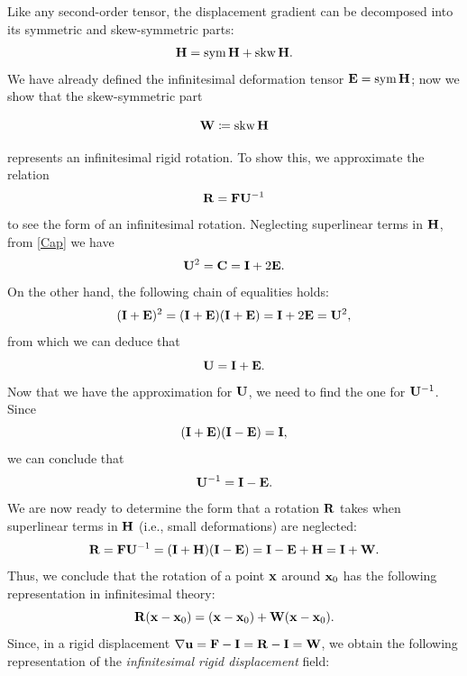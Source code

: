 Like any second-order tensor, the displacement gradient can be decomposed into its symmetric and skew-symmetric parts:
\begin{equation}
	\mathbf{H}=\operatorname{sym} \mathbf{H}+\operatorname{skw} \mathbf{H}.
\end{equation}
We have already defined the infinitesimal deformation tensor \(\mathbf{E}=\operatorname{sym} \mathbf{H}\); now we show that the skew-symmetric part
\begin{definition}
	\begin{equation}
		\mathbf{W}\coloneqq\operatorname{skw} \mathbf{H}
	\end{equation}
\end{definition}
represents an infinitesimal rigid rotation. To show this, we approximate the relation
\begin{equation}
	\mathbf{R}=\mathbf{F}\mathbf{U}^{-1}
\end{equation}
to see the form of an infinitesimal rotation. Neglecting superlinear terms in \(\mathbf{H}\), from \eqref{Cap} we have
\begin{equation}
	\mathbf{U}^2=\mathbf{C}=\mathbf{I}+2\mathbf{E}.
\end{equation}
On the other hand, the following chain of equalities holds:
\begin{equation}
	(\mathbf{I}+\mathbf{E})^2=(\mathbf{I}+\mathbf{E})(\mathbf{I}+\mathbf{E})=\mathbf{I}+2\mathbf{E}=\mathbf{U}^2,
\end{equation}
from which we can deduce that
\begin{equation}
	\mathbf{U}=\mathbf{I}+\mathbf{E}.
\end{equation}
Now that we have the approximation for \(\mathbf{U}\), we need to find the one for \(\mathbf{U}^{-1}\). Since
\begin{equation}
	(\mathbf{I}+\mathbf{E})(\mathbf{I}-\mathbf{E})=\mathbf{I},
\end{equation}
we can conclude that
\begin{equation}
	\mathbf{U}^{-1}=\mathbf{I}-\mathbf{E}.
\end{equation}
We are now ready to determine the form that a rotation \(\mathbf{R}\) takes when superlinear terms in \(\mathbf{H}\) (i.e., small deformations) are neglected:
\begin{equation}
	\mathbf{R}=\mathbf{F}\mathbf{U}^{-1}=(\mathbf{I}+\mathbf{H})(\mathbf{I}-\mathbf{E})=\mathbf{I}-\mathbf{E}+\mathbf{H}=\mathbf{I}+\mathbf{W}.
\end{equation}
Thus, we conclude that the rotation of a point \(\mathbf{x}\) around \(\mathbf{x}_0\) has the following representation in infinitesimal theory:
\begin{equation}
	\mathbf{R}(\mathbf{x}-\mathbf{x}_0)=(\mathbf{x}-\mathbf{x}_0)+\mathbf{W}(\mathbf{x}-\mathbf{x}_0).
\end{equation}
Since, in a rigid displacement \(\nabla \mathbf{u}=\mathbf{F}-\mathbf{I}=\mathbf{R}-\mathbf{I}=\mathbf{W}\), we obtain the following representation of the \textit{infinitesimal rigid displacement} field:
